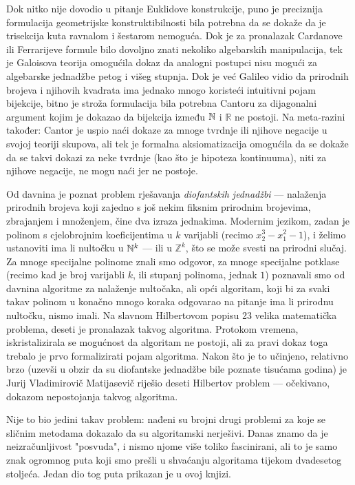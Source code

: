 Dok nitko nije dovodio u pitanje Euklidove konstrukcije, puno je preciznija formulacija geometrijske konstruktibilnosti bila potrebna da se dokaže da je trisekcija kuta ravnalom i šestarom nemoguća. Dok je za pronalazak Cardanove ili Ferrarijeve formule bilo dovoljno znati nekoliko algebarskih manipulacija, tek je Galoisova teorija omogućila dokaz da analogni postupci nisu mogući za algebarske jednadžbe petog i višeg stupnja. Dok je već Galileo vidio da prirodnih brojeva i njihovih kvadrata ima jednako mnogo koristeći intuitivni pojam bijekcije, bitno je stroža formulacija bila potrebna Cantoru za dijagonalni argument kojim je dokazao da bijekcija između ${\mathbb N}$ i $\mathbb R$ ne postoji. Na meta-razini također: Cantor je uspio naći dokaze za mnoge tvrdnje ili njihove negacije u svojoj teoriji skupova, ali tek je formalna aksiomatizacija omogućila da se dokaže da se takvi dokazi za neke tvrdnje (kao što je hipoteza kontinuuma), niti za njihove negacije, ne mogu naći jer ne postoje.

Od davnina je poznat problem rješavanja \emph{diofantskih jednadžbi} --- nalaženja prirodnih brojeva koji zajedno s još nekim fiksnim prirodnim brojevima, zbrajanjem i množenjem, čine dva izraza jednakima. Modernim jezikom, zadan je polinom s cjelobrojnim koeficijentima u $k$ varijabli (recimo $x_2^3-x_1^2-1$), i želimo ustanoviti ima li nultočku u ${\mathbb N}^k$ --- ili u $\mathbb Z^k$, što se može svesti na prirodni slučaj. Za mnoge specijalne polinome znali smo odgovor, za mnoge specijalne potklase (recimo kad je broj varijabli $k$, ili stupanj polinoma, jednak $1$) poznavali smo od davnina algoritme za nalaženje nultočaka, ali opći algoritam, koji bi za svaki takav polinom u konačno mnogo koraka odgovarao na pitanje ima li prirodnu nultočku, nismo imali. Na slavnom Hilbertovom popisu 23 velika matematička problema, deseti je pronalazak takvog algoritma. Protokom vremena, iskristalizirala se mogućnost da algoritam ne postoji, ali za pravi dokaz toga trebalo je prvo formalizirati pojam algoritma. Nakon što je to učinjeno, relativno brzo (uzevši u obzir da su diofantske jednadžbe bile poznate tisućama godina) je Jurij Vladimirovič Matijasevič riješio deseti Hilbertov problem --- očekivano, dokazom nepostojanja takvog algoritma.

Nije to bio jedini takav problem: nađeni su brojni drugi problemi za koje se sličnim metodama dokazalo da su algoritamski nerješivi. Danas znamo da je neizračunljivost "posvuda", i nismo njome više toliko fascinirani, ali to je samo znak ogromnog puta koji smo prešli u shvaćanju algoritama tijekom dvadesetog stoljeća. Jedan dio tog puta prikazan je u ovoj knjizi.

